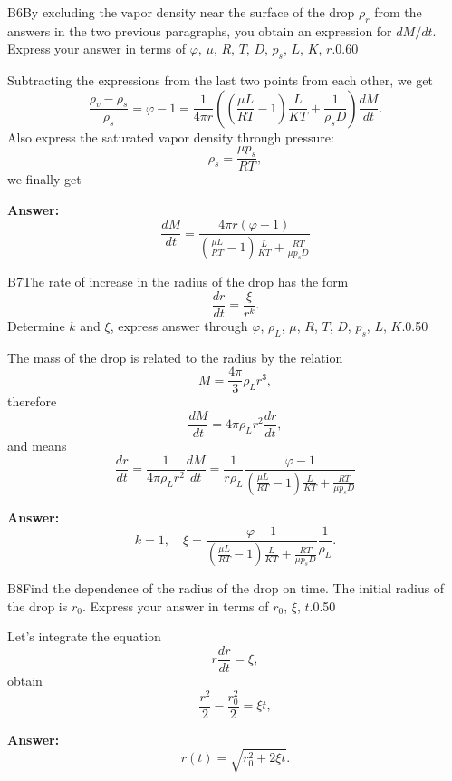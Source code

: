 \documentclass[11pt,a4paper]{article}
\begin{document}
\begin{solcard}{B6}{By excluding the vapor density near the surface of the drop $\rho_r$ from the answers in the two previous paragraphs, you obtain an expression for $dM/dt$. Express your answer in terms of $\varphi$, $\mu$, $R$, $T$, $D$, $p_s$, $L$, $K$, $r$.}{0.60}

Subtracting the expressions from the last two points from each other, we get $$ \frac{\rho_v - \rho_s}{\rho_s} = \varphi - 1= \frac{1}{4 \pi r}\left( \left( \frac{\mu L}{R T} - 1\right)\frac{L}{ K T} +\frac{1}{\rho_s D}  \right) \frac{dM}{dt}. $$Also express the saturated vapor density through pressure: $$ \rho_s = \frac{\mu p_s}{R T}, $$we finally get

\par\smallskip\noindent\textbf{Answer:} $$ \frac{dM}{dt} = \frac{4 \pi r (\varphi - 1)}{\left( \frac{\mu L}{R T} - 1\right)\frac{L}{ K T} +\frac{R T}{\mu p_s D} } $$
\end{solcard}

\begin{solcard}{B7}{The rate of increase in the radius of the drop has the form $$ \frac{dr}{dt} = \frac{\xi}{r^k}. $$ Determine $k$ and $\xi$, express answer through $\varphi $, $\rho_L$, $\mu$, $R$, $T$, $D$, $p_s$, $L$, $K$.}{0.50}

The mass of the drop is related to the radius by the relation $$ M = \frac{4 \pi}{3} \rho_L r^3, $$therefore $$ \frac{dM}{dt} = 4 \pi \rho_L r^2 \frac{dr}{dt}, $$and means $$ \frac{dr}{dt} = \frac{1}{4 \pi \rho_L r^2} \frac{dM}{dt} = \frac{1}{r \rho_L}  \frac{\varphi - 1}{\left( \frac{\mu L}{R T} - 1\right)\frac{L}{ K T} +\frac{R T}{\mu p_s D} } $$

\par\smallskip\noindent\textbf{Answer:} $$ k = 1, \quad \xi = \frac{\varphi - 1}{\left( \frac{\mu L}{R T} - 1\right)\frac{L}{ K T} +\frac{R T}{\mu p_s D} } \frac{1}{\rho_L}. $$
\end{solcard}

\begin{solcard}{B8}{Find the dependence of the radius of the drop on time. The initial radius of the drop is $r_0$. Express your answer in terms of $r_0$, $\xi$, $t$.}{0.50}

Let's integrate the equation $$ r \frac{dr}{dt} = \xi, $$obtain $$ \frac{r^2}{2} - \frac{r_0^2}{2} = \xi t, $$

\par\smallskip\noindent\textbf{Answer:} $$ r(t) = \sqrt{r_0^2 + 2 \xi t}. $$
\end{solcard}
\end{document}

